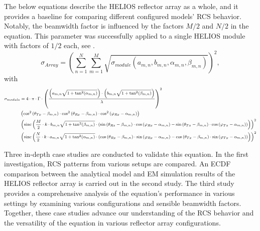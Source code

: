 The below equations describe the HELIOS reflector array as a whole, and it provides a baseline for comparing different configured models' RCS behavior. Notably, the beamwidth factor is influenced by the factors $M/2$ and $N/2$ in the equation. This parameter was successfully applied to a single HELIOS module with factors of $1/2$ each, see .
\begin{equation}\label{Eq:RCS_SUMMATION}
	\sigma_{Array}= \left(\sum_{n=1}^{N}\sum_{m=1}^{M} \sqrt{\sigma_{module} \left( a_{m,n}, b_{m,n}, \alpha_{m,n}, \beta_{m,n} \right) } \right)^2,
\end{equation}
with
\begin{equation} \label{Eq:HELIOS_array}
	\footnotesize
	\begin{aligned}
		 \sigma_{module} &=4 \cdot \pi \cdot \Gamma \cdot \left( \frac{\left( a_{m,n}\sqrt{1+\tan^2(\alpha_{m,n})}\right) \cdot \left( b_{m,n} \sqrt{1+\tan^2(\beta_{m,n})} \right) }{\lambda} \right) ^2\\
		&\left( \cos^2 \left( \theta_{Tx}-\beta_{m,n} \right) \cdot \cos^2 \left( \theta_{Rx}-\beta_{m,n} \right) \cdot \cos^2 \left( \varphi_{Rx}-\alpha_{m,n} \right) \right)\\
		& \left( \operatorname{sinc} \left( \frac{M}{2} \cdot k \cdot b_{m,n} \sqrt{1+\tan^2(\beta_{m,n})} \cdot \left( \sin \left( \theta_{Rx}-\beta_{m,n} \right) \cdot \cos \left( \varphi_{Rx}-\alpha_{m,n} \right) -\sin \left( \theta_{Tx}-\beta_{m,n} \right) \cdot \cos \left( \varphi_{Tx}-\alpha_{m,n} \right) \right) \right) \right)^2\\
		&  \left( \operatorname{sinc} \left( \frac{N}{2} \cdot k \cdot a_{m,n} \sqrt{1+\tan^2(\alpha_{m,n})} \cdot \left( \cos \left( \theta_{Rx}-\beta_{m,n} \right) \cdot \sin \left( \varphi_{Rx}-\alpha_{m,n} \right) -\cos \left( \theta_{Tx}-\beta_{m,n} \right) \cdot \sin \left( \varphi_{Tx}-\alpha_{m,n} \right) \right) \right) \right)^2 
	\end{aligned}
\end{equation}

Three in-depth case studies are conducted to validate this equation. In the first investigation, RCS patterns from various setups are compared. An ECDF comparison between the analytical model and EM simulation results of the HELIOS reflector array is carried out in the second study. The third study provides a comprehensive analysis of the equation's performance in various settings by examining various configurations and sensible beamwidth factors. Together, these case studies advance our understanding of the RCS behavior and the versatility of the equation in various reflector array configurations.
